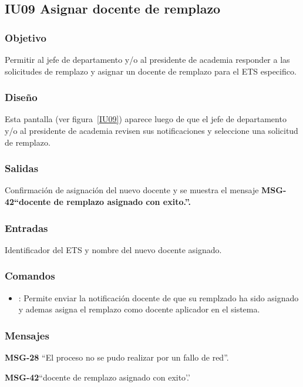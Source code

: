 \subsection{IU09 Asignar docente de remplazo}

\subsubsection{Objetivo}
Permitir al jefe de departamento y/o al presidente de academia responder a las solicitudes de remplazo y asignar un docente de remplazo para el ETS especifico.

\subsubsection{Diseño}
Esta pantalla  (ver figura~\ref{IU09}) aparece luego de que el jefe de departamento y/o al presidente de academia revisen sus notificaciones y seleccione una solicitud de remplazo.


\subsubsection{Salidas}
Confirmación de asignación del nuevo docente y se muestra el mensaje \bf MSG-42{``docente de remplazo asignado con exito.''}.

\subsubsection{Entradas}
Identificador del ETS y nombre del nuevo docente asignado.

\subsubsection{Comandos}
\begin{itemize}
	\item {}: Permite enviar la notificación docente de que su remplzado ha sido asignado y ademas asigna el remplazo como docente aplicador en el sistema.
\end{itemize}

\subsubsection{Mensajes}

\begin{Citemize}
	\item {\bf MSG-28} {``El proceso no se pudo realizar por un fallo de red''.}
	\item {\bf MSG-42}{``docente de remplazo asignado con exito'.'}
\end{Citemize}


